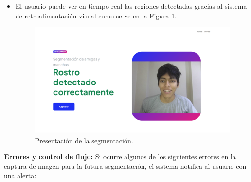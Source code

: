 \begin{itemize}
\item El usuario puede ver en tiempo real las regiones detectadas gracias al sistema de retroalimentación visual como se ve en la Figura \ref{fig:presseg}.

\begin{figure}[H]
      \centering
      \includegraphics[width=1\textwidth]{4/figures/PresCamActive.png}
      \caption{Presentación de la segmentación.}
      \label{fig:presseg}
    \end{figure}

  \end{itemize}
\textbf{Errores y control de flujo:}
Si ocurre algunos de los siguientes errores en la captura de imagen para la futura segmentación, el sistema notifica al usuario con una alerta:

